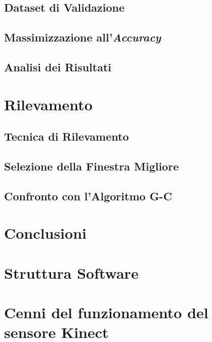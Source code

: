     \section{Dataset di Validazione}
    \label{sec:validation_dataset}
    \section{Massimizzazione all'\emph{Accuracy}}
    \label{sec:accuracy_maximization}
    \section{Analisi dei Risultati}
    \label{sec:Analisi dei Risultati}

\chapter{Rilevamento}
\label{chap:rilevamento}
    \section{Tecnica di Rilevamento}
    \label{sec:detection_tecnique}
    \section{Selezione della Finestra Migliore} %
    \label{sec:best_detection_window}
    \section{Confronto con l'Algoritmo G-C} %
    \label{sec:gc_algorithm_comparison}

\chapter{Conclusioni}

\begin{appendices}
    \chapter{Struttura Software}
    \label{chap:Struttura Software}

    \chapter{Cenni del funzionamento del sensore Kinect}
    \label{chap:Cenni del funzionamento del sensore Kinect}
\end{appendices}
